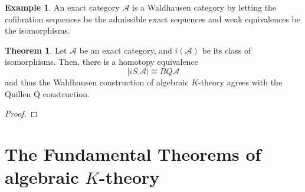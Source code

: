 \documentclass{article}
\theoremstyle{definition}
\newtheorem{theorem}{Theorem}[section]
\theoremstyle{definition}
\theoremstyle{definition}
\theoremstyle{definition}
\theoremstyle{definition}
\theoremstyle{definition}
\theoremstyle{definition}
\newtheorem{example}{Example}[theorem]
\begin{document}
\begin{tcolorbox}[colback=yellow!5!white,colframe=yellow!30!white]
\begin{example}
An exact category $\mathcal{A}$ is a Waldhausen category by letting the cofibration sequences be the admissible exact sequences and weak equivalences be the isomorphisms. 
\end{example}
\end{tcolorbox}


\begin{tcolorbox}[colback=red!5!white,colframe=red!30!white]
\begin{theorem}
Let $\mathcal{A}$ be an exact category, and $i(\mathcal{A})$ be its class of isomorphisms. Then, there is a homotopy equivalence 
\[|iS_{\cdot} \mathcal{A}|\cong BQ \mathcal{A}\]
and thus the Waldhausen construction of algebraic $K$-theory agrees with the Quillen Q construction. 
\end{theorem}
\end{tcolorbox}
\begin{proof}
    
\end{proof}



\section{The Fundamental Theorems of algebraic $K$-theory}
















\printbibliography
\end{document}

